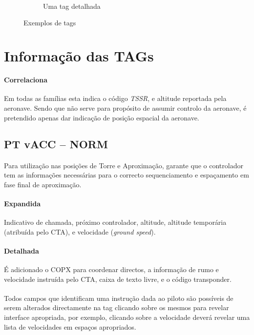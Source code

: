 \documentclass[10pt]{report}
\begin{document}
\begin{figure}[h]
\begin{subfigure}[b]{0.3\textwidth}
\begin{center}
            \caption{Uma tag detalhada}
            \label{fig:detailed}
        \end{center}
    \end{subfigure}
    \caption{Exemplos de tags}\label{fig:tag-examples}
\end{figure}

\section{Informação das TAGs}

\paragraph*{Correlaciona} Em todas as famílias esta indica o código \textit{TSSR}, e altitude
reportada pela aeronave. Sendo que não serve para propósito de assumir controlo da aeronave, é
pretendido apenas dar indicação de posição espacial da aeronave.

\subsection{PT vACC – NORM}
\label{sec:tag-norm}

\paragraph*{} Para utilização nas posições de Torre e Aproximação, garante que o controlador tem as
informações necessárias para o correcto sequenciamento e espaçamento em fase final de aproximação.

\paragraph*{Expandida} Indicativo de chamada, próximo controlador, altitude, altitude
temporária (atribuída pelo CTA), e velocidade (\textit{ground speed}).

\paragraph*{Detalhada} É adicionado o COPX para coordenar directos, a informação de rumo e
velocidade instruída pelo CTA, caixa de texto livre, e o código transponder.

\paragraph*{} Todos campos que identificam uma instrução dada ao piloto são possíveis de serem
alterados directamente na tag clicando sobre os mesmos para revelar interface apropriada, por
exemplo, clicando sobre a velocidade deverá revelar uma lista de velocidades em espaços
apropriados.
\end{document}

